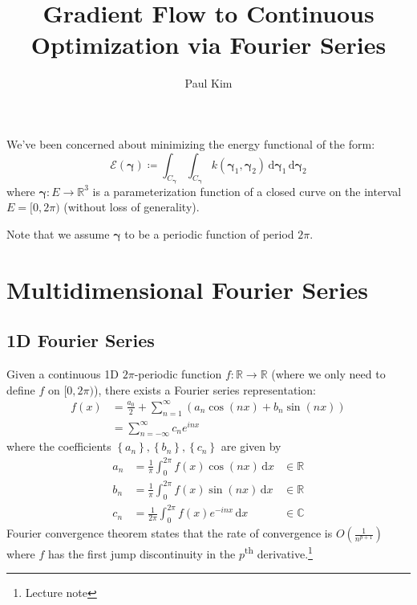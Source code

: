 \documentclass[a4paper]{article}
\title{Gradient Flow to Continuous Optimization via Fourier Series}
\author{Paul Kim}
\newcommand{\dx}{\, \text{d} x}
\newcommand{\dgammabf}{\, \text{d} \boldsymbol{\gamma}}
\begin{document}
\maketitle

We've been concerned about minimizing the energy functional of the form:
\begin{equation}
    \mathcal{E} (\boldsymbol{\gamma}) \coloneqq \int_{C_{\boldsymbol{\gamma}}} \int_{C_{\boldsymbol{\gamma}}} k\left( \boldsymbol{\gamma}_1, \boldsymbol{\gamma}_2 \right) \dgammabf_1 \dgammabf_2
\end{equation}
where $\boldsymbol{\gamma}: E \rightarrow \mathbb{R}^{3}$ is a parameterization function of a closed curve on the interval $E = [ 0, 2\pi )$ (without loss of generality).

Note that we assume $\boldsymbol{\gamma}$ to be a periodic function of period $2 \pi$.

\section{Multidimensional Fourier Series}
\subsection{1D Fourier Series}
Given a continuous 1D $2\pi$-periodic function $f: \mathbb{R} \rightarrow \mathbb{R}$ (where we only need to define $f$ on $[0, 2\pi)$), there exists a Fourier series representation:
\begin{align}
    f (x) &= \frac{a_0}{2} + \sum_{n = 1}^{\infty} \left( a_n \cos {\left( nx \right)} + b_n \sin {\left( nx \right)} \right) \\
    &= \sum_{n=-\infty}^{\infty} c_n e^{i n x}
\end{align}
where the coefficients $\left\{ a_n \right\}, \left\{ b_n \right\}, \left\{ c_n \right\}$ are given by
\begin{align}
    a_n &= \frac{1}{\pi} \int_{0}^{2\pi} f(x) \cos {\left( nx \right)} \dx &\in \mathbb{R}\\
    b_n &= \frac{1}{\pi} \int_{0}^{2\pi} f(x) \sin {\left( nx \right)} \dx &\in \mathbb{R} \\
    c_n &= \frac{1}{2 \pi} \int_{0}^{2\pi} f(x) e^{-inx} \dx &\in \mathbb{C}
\end{align}
Fourier convergence theorem states that the rate of convergence is $O\left( \frac{1}{n^{p+1}} \right)$ where $f$ has the first jump discontinuity in the $p$\textsuperscript{th} derivative.\footnote{Lecture note}
\end{document}
